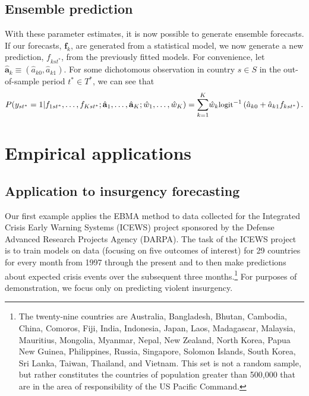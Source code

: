 \documentclass[pdftex,12pt,fullpage,oneside]{amsart}
\begin{document}
\subsection{Ensemble prediction}

With these parameter estimates, it is now possible to generate
ensemble forecasts. If our forecasts, $\mathbf{f}_k$, are generated
from a statistical model, we now generate a new prediction,
$f_{kst^\ast}$, from the previously fitted models. For convenience,
let $\hat{\mathbf{a}}_k \equiv (\hat{a}_{k0}, \hat{a}_{k1})$. For some
dichotomous observation in country $s\in S$ in the out-of-sample
period $t^\ast\in T^\ast$, we can see that
\begin{equation}
\label{nothing}
{\small
P(y_{st^*} = 1 | f_{1st^\ast}, \ldots, f_{Kst^\ast} ;  \hat{\mathbf{a}}_1,
 \ldots, \hat{\mathbf{a}}_K ; \hat{w}_1, \ldots, \hat{w}_K) =
 \overset{K}{\underset{k=1}{\sum}} \hat{w}_k
 \mbox{logit}^{-1}\left(\hat{a}_{k0} +  \hat{a}_{k1}f_{kst^\ast}\right).}
\end{equation}



\section{Empirical applications}

\subsection{Application to insurgency forecasting}

Our first example applies the EBMA method to data collected for the
Integrated Crisis Early Warning Systems (ICEWS) project sponsored by
the Defense Advanced Research Projects Agency (DARPA).  The task of
the ICEWS project is to train models on data (focusing on five
outcomes of interest) for 29 countries for every month from 1997
through the present and to then make predictions about expected crisis
events over the subsequent three months.\footnote{The twenty-nine
  countries are Australia, Bangladesh, Bhutan, Cambodia, China,
  Comoros, Fiji, India, Indonesia, Japan, Laos, Madagascar, Malaysia,
  Mauritius, Mongolia, Myanmar, Nepal, New Zealand, North Korea, Papua
  New Guinea, Philippines, Russia, Singapore, Solomon Islands, South
  Korea, Sri Lanka, Taiwan, Thailand, and Vietnam. This set is not a
  random sample, but rather constitutes the countries of population
  greater than 500,000 that are in the area of responsibility of the
  US Pacific Command.}  For purposes of demonstration, we focus only
on predicting violent insurgency.
\end{document}
